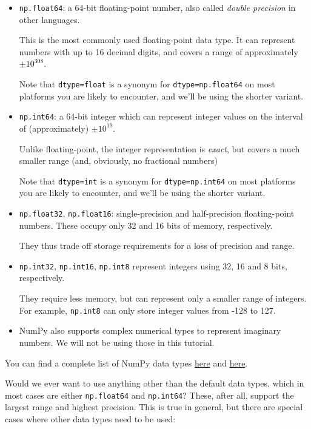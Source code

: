 \documentclass[10pt]{scrartcl}
\begin{document}
\begin{itemize}
\item
  \texttt{np.float64}: a 64-bit floating-point number, also called
  \emph{double precision} in other languages.

  This is the most commonly used floating-point data type. It can
  represent numbers with up to 16 decimal digits, and covers a range of
  approximately \(\pm 10^{308}\).

  Note that \texttt{dtype=float} is a synonym for
  \texttt{dtype=np.float64} on most platforms you are likely to
  encounter, and we'll be using the shorter variant.
\item
  \texttt{np.int64}: a 64-bit integer which can represent integer values
  on the interval of (approximately) \(\pm10^{19}\).

  Unlike floating-point, the integer representation is \emph{exact}, but
  covers a much smaller range (and, obviously, no fractional numbers)

  Note that \texttt{dtype=int} is a synonym for \texttt{dtype=np.int64}
  on most platforms you are likely to encounter, and we'll be using the
  shorter variant.
\item
  \texttt{np.float32}, \texttt{np.float16}: single-precision and
  half-precision floating-point numbers. These occupy only 32 and 16
  bits of memory, respectively.

  They thus trade off storage requirements for a loss of precision and
  range.
\item
  \texttt{np.int32}, \texttt{np.int16}, \texttt{np.int8} represent
  integers using 32, 16 and 8 bits, respectively.

  They require less memory, but can represent only a smaller range of
  integers. For example, \texttt{np.int8} can only store integer values
  from -128 to 127.
\item
  NumPy also supports complex numerical types to represent imaginary
  numbers. We will not be using those in this tutorial.
\end{itemize}

You can find a complete list of NumPy data types
\href{https://numpy.org/doc/stable/user/basics.types.html}{here} and
\href{https://numpy.org/doc/stable/reference/arrays.scalars.html#sized-aliases}{here}.

Would we ever want to use anything other than the default data types,
which in most cases are either \texttt{np.float64} and
\texttt{np.int64}? These, after all, support the largest range and
highest precision. This is true in general, but there are special cases
where other data types need to be used:
\end{document}
